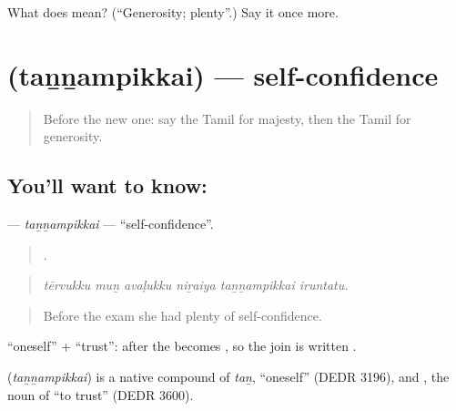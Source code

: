 \begin{tcolorbox}[breakable,colback=teal!4,colframe=teal!35!black,title={Before you move on}]
What does  mean? (\textquotedblleft{}Generosity; plenty\textquotedblright{}.) Say it once more.
\end{tcolorbox}
\section[\texorpdfstring{\ta{தன்னம்பிக்கை} (taṉṉampikkai)}{தன்னம்பிக்கை (taṉṉampikkai)}]{ (taṉṉampikkai) — self-confidence}

\label{lesson:TA-C473-tannampikkai}



\begin{quote}
Before the new one: say the Tamil for majesty, then the Tamil for generosity.
\end{quote}

\subsection*{You'll want to know: }
\textbf{} — \emph{taṉṉampikkai} — \textquotedblleft{}self-confidence\textquotedblright{}.

\begin{quote}
     .
\end{quote}

\begin{quote}
\emph{tērvukku muṉ avaḷukku niṟaiya taṉṉampikkai iruntatu.}
\end{quote}

\begin{quote}
Before the exam she had plenty of self-confidence.
\end{quote}

 \textquotedblleft{}oneself\textquotedblright{} +  \textquotedblleft{}trust\textquotedblright{}: after  the  becomes , so the join is written .

\begin{cousinweb}
\textbf{} (\emph{taṉṉampikkai}) is a native compound of  \emph{taṉ}, \textquotedblleft{}oneself\textquotedblright{} (DEDR 3196), and , the noun of  \textquotedblleft{}to trust\textquotedblright{} (DEDR 3600).
\end{cousinweb}


